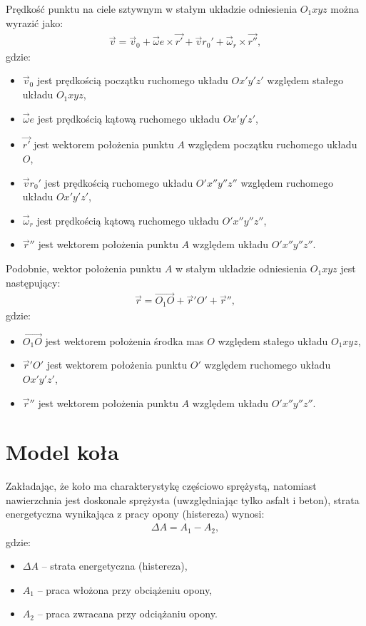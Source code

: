 \documentclass{article}
\begin{document}
	Prędkość punktu na ciele sztywnym w stałym układzie odniesienia $O_1xyz$ można wyrazić jako:
	\begin{align}
		\vec{v} = \vec{v}_0 + \vec{\omega}e \times \vec{r'} + \vec{v}{r_0'} + \vec{\omega}_r \times \vec{r''},
	\end{align}
	gdzie:
	\begin{itemize}
		\item $\vec{v}_0$ jest prędkością początku ruchomego układu $Ox'y'z'$ względem stałego układu $O_1xyz$,
		\item $\vec{\omega}e$ jest prędkością kątową ruchomego układu $Ox'y'z'$,
		\item $\vec{r'}$ jest wektorem położenia punktu $A$ względem początku ruchomego układu $O$,
		\item $\vec{v}{r_0'}$ jest prędkością ruchomego układu $O'x''y''z''$ względem ruchomego układu $Ox'y'z'$,
		\item $\vec{\omega}_r$ jest prędkością kątową ruchomego układu $O'x''y''z''$,
		\item $\vec{r}''$ jest wektorem położenia punktu $A$ względem układu $O'x''y''z''$.
	\end{itemize}
	
	Podobnie, wektor położenia punktu $A$ w stałym układzie odniesienia $O_1xyz$ jest następujący:
	\begin{align}
		\vec{r} = \overrightarrow{O_1O} + \vec{r}'{O'} + \vec{r}'',
	\end{align}
	gdzie:
	\begin{itemize}
		\item $\overrightarrow{O_1O}$ jest wektorem położenia środka mas $O$ względem stałego układu $O_1xyz$,
		\item $\vec{r}'{O'}$ jest wektorem położenia punktu $O'$ względem ruchomego układu $Ox'y'z'$,
		\item $\vec{r}''$ jest wektorem położenia punktu $A$ względem układu $O'x''y''z''$.
	\end{itemize}
	
	\section{Model koła}
	
	Zakładając, że koło ma charakterystykę częściowo sprężystą, natomiast nawierzchnia jest doskonale sprężysta (uwzględniając tylko asfalt i beton), strata energetyczna wynikająca z pracy opony (histereza) wynosi:
	\begin{align}
		\Delta A = A_1 - A_2,
	\end{align}
	gdzie:
	\begin{itemize}
		\item $\Delta A$ – strata energetyczna (histereza),
		\item $A_1$ – praca włożona przy obciążeniu opony,
		\item $A_2$ – praca zwracana przy odciążaniu opony.
	\end{itemize}
	
\end{document}
